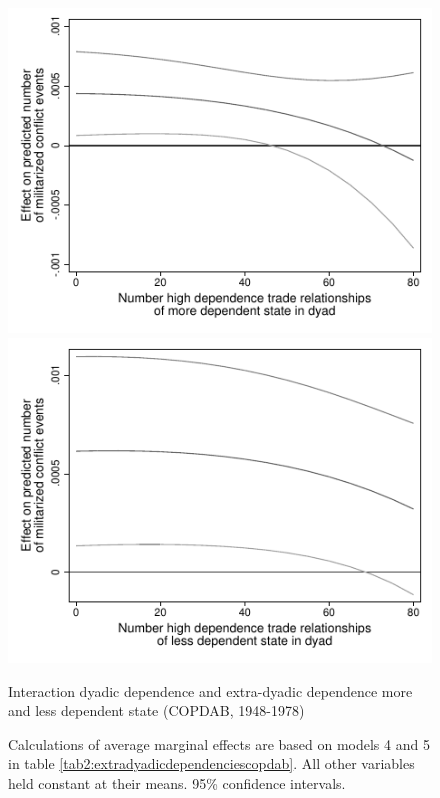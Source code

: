 \documentclass[12pt]{article}
\theoremstyle{hypothesis}
\begin{document}
\begin{figure}
\centering
\begin{minipage}{.5\textwidth}
  \centering
  \includegraphics[width=1\linewidth]{Interaction_Asymmetric_Dependence_More_Dependent_State_Mil_Conflict_10022016.pdf}
\end{minipage}%
\begin{minipage}{.5\textwidth}
  \centering
  \includegraphics[width=1\linewidth]{Interaction_Asymmetric_Dependence_Less_Dependent_State_Mil_Conflict_10022016.pdf}
\end{minipage}
\caption{Interaction dyadic dependence and extra-dyadic dependence more and less dependent state (COPDAB, 1948-1978)}
 \label{fig3:asymmetricdependenceinteraction}
\caption*{Calculations of average marginal effects are based on models 4 and 5 in table \ref{tab2:extradyadicdependenciescopdab}. All other variables held constant at their means. 95\% confidence intervals.}
\end{figure}
\end{document}
